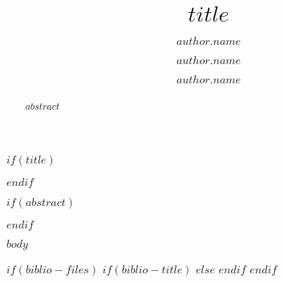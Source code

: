 \documentclass[$if(fontsize)$$fontsize$,$else$11pt, $endif$a4paper]{fisabior}
\title{$title$}
\author[$author.affilnumber$*]{$author.name$}
\author[$author.affilnumber$]{$author.name$}
\author{$author.name$}
\affil[$affil.number$]{$affil.name$}
\affil[*]{\corresponding}
\begin{document}

$if(title)$
\maketitle
$endif$

$if(abstract)$
\begin{abstract}
$abstract$
\end{abstract}
$endif$

$body$

$if(biblio-files)$
$if(biblio-title)$
\printbibliography[title = $biblio-title$]
$else$
\printbibliography[title = Referencias Bibliográficas]
$endif$
$endif$
\end{document}
